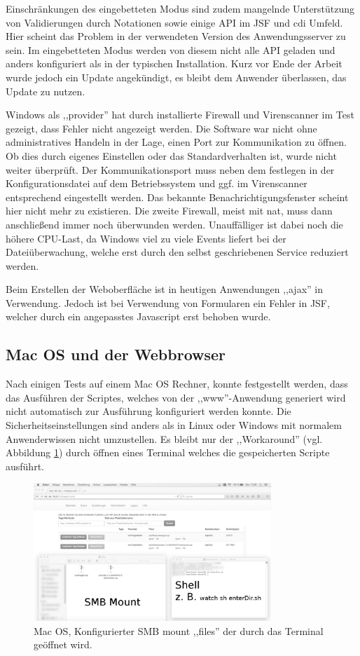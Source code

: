 \documentclass[oneside, ngerman, toc=bibliography,bibliography=totoc,listof=entryprefix, open=right,numbers=noenddot,fontsize=12pt]{scrbook}
\begin{document}
Einschränkungen des eingebetteten Modus sind zudem mangelnde Unterstützung von Validierungen durch Notationen sowie einige API im JSF und \acrshort{cdi} Umfeld.
Hier scheint das Problem in der verwendeten Version des Anwendungsserver zu sein. Im eingebetteten Modus werden von diesem nicht alle API geladen und anders konfiguriert als in der typischen Installation. Kurz vor Ende der Arbeit wurde jedoch ein Update angekündigt, es bleibt dem Anwender überlassen, das Update zu nutzen.


Windows als ,,provider'' hat durch installierte Firewall und Virenscanner im Test gezeigt, dass Fehler nicht angezeigt werden. Die Software war nicht ohne administratives Handeln in der Lage, einen Port zur Kommunikation zu öffnen. Ob dies durch eigenes Einstellen oder das Standardverhalten ist, wurde nicht weiter überprüft. Der Kommunikationsport muss neben dem festlegen in der Konfigurationsdatei auf dem Betriebssystem und ggf. im Virenscanner entsprechend eingestellt werden. Das bekannte Benachrichtigungsfenster scheint hier nicht mehr zu existieren. Die zweite Firewall, meist mit  \acrshort{nat}, muss dann anschließend immer noch überwunden werden. Unauffälliger ist dabei noch die höhere CPU-Last, da Windows viel zu viele Events liefert bei der Dateiüberwachung, welche erst durch den selbst geschriebenen Service reduziert werden.

Beim Erstellen der Weboberfläche ist in heutigen Anwendungen ,,ajax'' in Verwendung. Jedoch ist bei Verwendung von Formularen ein Fehler in JSF, welcher durch ein angepasstes Javascript erst behoben wurde. 


\subsection{Mac OS und der Webbrowser}
Nach einigen Tests auf einem Mac OS Rechner, konnte festgestellt werden, dass das Ausführen der Scriptes, welches von der ,,www''-Anwendung generiert wird nicht automatisch zur Ausführung konfiguriert werden konnte. Die Sicherheitseinstellungen sind anders als in Linux oder Windows mit normalem Anwenderwissen nicht umzustellen.
Es bleibt nur der ,,Workaround'' (vgl. Abbildung \ref{fig:apple}) durch öffnen eines Terminal welches die gespeicherten Scripte ausführt.
\begin{figure}[htbp] 
    \centering
    \includegraphics[width=0.8\textwidth]{Masterarbeit_Bilder/appel_terminal.png}
    \caption{Mac OS, Konfigurierter SMB mount ,,files'' der durch das Terminal geöffnet wird. }
    \label{fig:apple}
\end{figure}  
\end{document}
